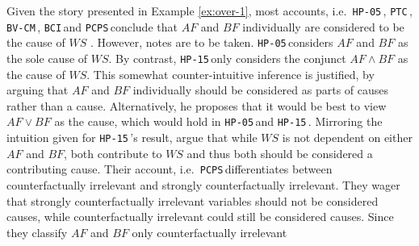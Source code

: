 \documentclass[11pt,a4paper]{book}
\theoremstyle{definition}
\theoremstyle{definition}
\theoremstyle{definition}
\theoremstyle{remark}
\newcommand{\hpu}{\texttt{HP-05}\,}
\newcommand{\ptc}{\texttt{PTC}\,}
\newcommand{\hpm}{\texttt{HP-15}\,}
\newcommand{\bvcm}{\texttt{BV-CM}\,}
\newcommand{\bci}{\texttt{BCI}\,}
\newcommand{\pcps}{\texttt{PCPS}\,}
\newcommand{\sccf}{\texttt{SC-CF}\,}
\begin{document}
Given the story presented in Example \ref{ex:over-1}, most accounts, i.e.\ \hpu, \ptc, \bvcm, \bci and \pcps  conclude that $AF$ and $BF$ individually are considered to be the cause of $WS$ \parencite{beckers2018principled,bochman2018actual,denecker2018causal,weslake2015partial,halpern2016actual}.
However, notes are to be taken. \hpu considers $AF$ and $BF$ as the sole cause of $WS$. 
By contrast, \hpm only considers the conjunct $AF \land BF$ as the cause of $WS$. This somewhat counter-intuitive inference is justified, by arguing that $AF$ and $BF$ individually should be considered as parts of causes rather than a cause. Alternatively, he proposes that it would be best to view $AF \lor BF$ as the cause, which would hold in \hpu and \hpm \parencite[p.~29]{halpern2016actual}.
Mirroring the intuition given for \hpm's result, \parencite{beckers2018principled} argue that while $WS$ is not dependent on either $AF$ and $BF$, both contribute to $WS$ and thus both should be considered a contributing cause. 
Their account, i.e.\ \pcps differentiates between counterfactually irrelevant and strongly counterfactually irrelevant. They wager that strongly counterfactually irrelevant variables should not be considered causes, while counterfactually irrelevant could still be considered causes. Since they classify $AF$ and $BF$ only counterfactually irrelevant 














\end{document}
